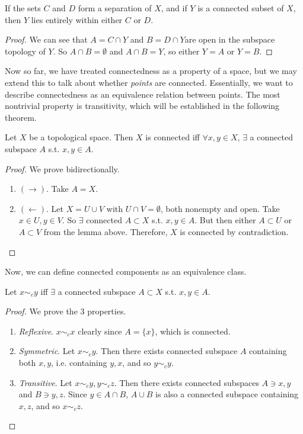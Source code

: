   \begin{lemma}
    If the sets $C$ and $D$ form a separation of $X$, and if $Y$ is a connected subset of $X$, then $Y$ lies entirely within either $C$ or $D$. 
  \end{lemma}
  \begin{proof}
    We can see that $A = C \cap Y$ and $B = D \cap Y$are open in the subspace topology of $Y$. So $A \cap B = \emptyset$ and $A \cap B = Y$, so either $Y = A$ or $Y = B$. 
  \end{proof}

  Now so far, we have treated connectedness as a property of a space, but we may extend this to talk about whether \textit{points} are connected. Essentially, we want to describe connectedness as an equivalence relation between points. The most nontrivial property is transitivity, which will be established in the following theorem. 

  \begin{theorem}
    Let $X$ be a topological space. Then $X$ is connected iff $\forall x, y \in X$, $\exists$ a connected subspace $A$ s.t. $x, y \in A$. 
  \end{theorem}
  \begin{proof}
    We prove bidirectionally. 
    \begin{enumerate}
      \item $(\rightarrow)$. Take $A = X$. 
      \item $(\leftarrow)$. Let $X = U \cup V$ with $U \cap V = \emptyset$, both nonempty and open. Take $x \in U, y \in V$. So $\exists$ connected $A \subset X$ s.t. $x, y \in A$. But then either $A \subset U$ or $A \subset V$ from the lemma above. Therefore, $X$ is connected by contradiction. 
    \end{enumerate}
  \end{proof}

  Now, we can define connected components as an equivalence class. 

  \begin{corollary}
    Let $x \sim_c y$ iff $\exists$ a connected subspace $A \subset X$ s.t. $x, y \in A$. 
  \end{corollary}
  \begin{proof}
    We prove the 3 properties. 
    \begin{enumerate}
      \item \textit{Reflexive}. $x \sim_c x$ clearly since $A = \{x\}$, which is connected. 
      \item \textit{Symmetric}. Let $x \sim_c y$. Then there exists connected subspace $A$ containing both $x, y$, i.e. containing $y, x$, and so $y \sim_c y$. 
      \item \textit{Transitive}. Let $x \sim_c y, y \sim_c z$. Then there exists connected subspaces $A \ni x, y$ and $B \ni y, z$. Since $y \in A \cap B$, $A \cup B$ is also a connected subspace containing $x, z$, and so $x \sim_c z$. 
    \end{enumerate}
  \end{proof}

